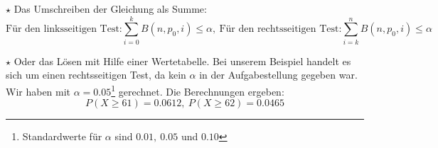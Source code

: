 		\(\star\) Das Umschreiben der Gleichung als Summe:
		\[\text{Für den linksseitigen Test:}\sum_{i=0}^{k}B(n,p_0,i)\leq \alpha,\
		\text{Für den rechtsseitigen Test:}\sum_{i=k}^{n}B(n,p_0,i)\leq \alpha\]
		
		\(\star\) Oder das Lösen mit Hilfe einer Wertetabelle.
		Bei unserem Beispiel handelt es sich um einen rechtsseitigen Test, da kein
		\(\alpha\) in der Aufgabestellung gegeben war. Wir haben mit
		\(\alpha=0.05\)\footnote{Standardwerte für \(\alpha\) sind \(0.01,\ 0.05\) und
		\(0.10\)} gerechnet. Die Berechnungen ergeben:
		\[P(X\geq 61)=0.0612,\ P(X\geq 62)=0.0465\] 
